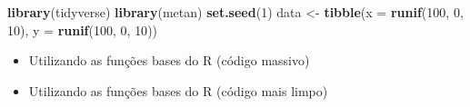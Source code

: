 \documentclass[
]{book}
\newenvironment{Shaded}{\begin{snugshade}}{\end{snugshade}}
\newcommand{\CommentTok}[1]{\textcolor[rgb]{0.56,0.35,0.01}{\textit{#1}}}
\newcommand{\DataTypeTok}[1]{\textcolor[rgb]{0.13,0.29,0.53}{#1}}
\newcommand{\DecValTok}[1]{\textcolor[rgb]{0.00,0.00,0.81}{#1}}
\newcommand{\KeywordTok}[1]{\textcolor[rgb]{0.13,0.29,0.53}{\textbf{#1}}}
\newcommand{\NormalTok}[1]{#1}
\newcommand{\OperatorTok}[1]{\textcolor[rgb]{0.81,0.36,0.00}{\textbf{#1}}}
\newcommand{\StringTok}[1]{\textcolor[rgb]{0.31,0.60,0.02}{#1}}
\providecommand{\tightlist}{%
  \setlength{\itemsep}{0pt}\setlength{\parskip}{0pt}}
\numberwithin{equation}{section}
\begin{document}
\begin{Shaded}
\begin{Highlighting}[]
\KeywordTok{library}\NormalTok{(tidyverse)}
\KeywordTok{library}\NormalTok{(metan)}
\KeywordTok{set.seed}\NormalTok{(}\DecValTok{1}\NormalTok{)}
\NormalTok{data \textless{}{-}}\StringTok{ }\KeywordTok{tibble}\NormalTok{(}\DataTypeTok{x =} \KeywordTok{runif}\NormalTok{(}\DecValTok{100}\NormalTok{, }\DecValTok{0}\NormalTok{, }\DecValTok{10}\NormalTok{),}
               \DataTypeTok{y =} \KeywordTok{runif}\NormalTok{(}\DecValTok{100}\NormalTok{, }\DecValTok{0}\NormalTok{, }\DecValTok{10}\NormalTok{))}
\end{Highlighting}
\end{Shaded}

\begin{itemize}
\tightlist
\item
  Utilizando as funções bases do R (código massivo)
\end{itemize}

\begin{Shaded}
\end{Shaded}

\begin{itemize}
\tightlist
\item
  Utilizando as funções bases do R (código mais limpo)
\end{itemize}

\begin{Shaded}
\end{Shaded}
\end{document}
